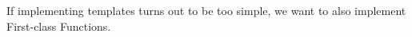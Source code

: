 If implementing templates turns out to be too simple, we want to also implement
First-class Functions.
